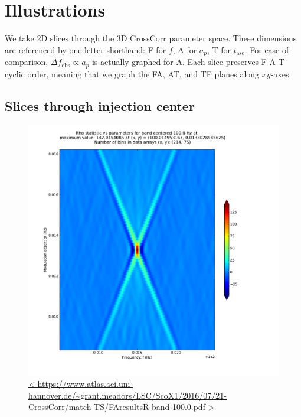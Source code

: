 \documentclass{article}
\begin{document}
\section{Illustrations}

We take 2D slices through the 3D CrossCorr parameter space.
These dimensions are referenced by one-letter shorthand: F for $f$, A for $a_p$, T for $t_\mathrm{asc}$.
For ease of comparison, $\Delta f_\mathrm{obs} \propto a_p$ is actually graphed for A.
Each slice preserves F-A-T cyclic order, meaning that we graph the FA, AT, and TF planes along $xy$-axes.



\subsection{Slices through injection center}

\begin{figure}
\includegraphics[trim= 0 0 0 0, clip, width=0.40\paperwidth,keepaspectratio]{plots/match-TS/FAresultsR-band-100-0.pdf}
\caption{
\url{<
https://www.atlas.aei.uni-hannover.de/~grant.meadors/LSC/ScoX1/2016/07/21-CrossCorr/match-TS/FAresultsR-band-100.0.pdf
>}
}
\label{FAcenterGraph}
\end{figure}
\end{document}
